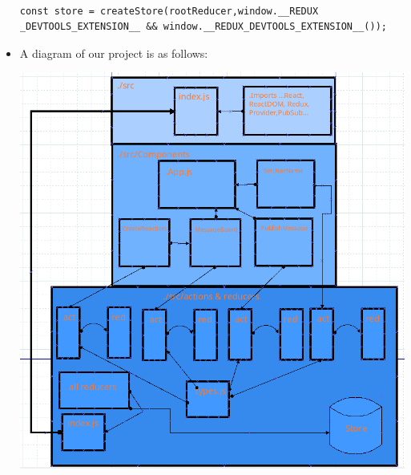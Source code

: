 \documentclass[8pt,a4paper]{extarticle}
\begin{document}
\begin{itemize}
\begin{verbatim}

const store = createStore(rootReducer,window.__REDUX
_DEVTOOLS_EXTENSION__ && window.__REDUX_DEVTOOLS_EXTENSION__());

\end{verbatim}
\item A diagram of our project is as follows:

\includegraphics[scale=0.3]{reaction_flowdiagram.png}


\end{itemize}
\end{document}
